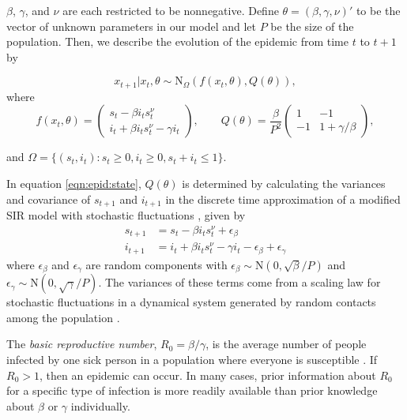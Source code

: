 \noindent $\beta$, $\gamma$, and $\nu$ are each restricted to be nonnegative. Define $\theta = (\beta,\gamma,\nu)'$ to be the vector of unknown parameters in our model and let $P$ be the size of the population. Then, we describe the evolution of the epidemic from time $t$ to $t + 1$ by

\begin{equation}
x_{t+1}\left|x_t,\theta\right. \sim \mbox{N}_\Omega\left(f(x_t,\theta),Q(\theta)\right), \label{eqn:epid:state}
\end{equation}
\noindent where
\[
f(x_t,\theta) = \left(
\begin{array}{c}
s_t - \beta i_ts^\nu_t \phantom{- \gamma i_t}\,\, \\
i_t +  \beta i_ts^\nu_t - \gamma i_t
\end{array}
\right),
\qquad
Q(\theta) = \frac{\beta}{P^2} \left(
\begin{array}{ccccc}
1 & -1 \\
-1 & 1 + \gamma/\beta
\end{array}
\right),
\]

\noindent and $\Omega = \{(s_t,i_t): s_t \ge 0, i_t \ge 0, s_t + i_t \le 1\}$.

In equation \eqref{eqn:epid:state}, $Q(\theta)$ is determined by calculating the variances and covariance of $s_{t+1}$ and $i_{t+1}$ in the discrete time approximation of a modified SIR model with stochastic fluctuations \citep{herwaarden1995stochepid, dangerfield2009stochepid, anderson2004sars}, given by
\begin{align*}
s_{t+1} &= s_t - \beta i_ts^\nu_t + \epsilon_\beta \\
i_{t+1} &= i_t + \beta i_ts^\nu_t - \gamma i_t - \epsilon_\beta + \epsilon_\gamma
\end{align*}
where $\epsilon_\beta$ and $\epsilon_\gamma$ are random components with $\epsilon_\beta \sim \mbox{N}(0, \sqrt{\beta} / P)$ and $\epsilon_\gamma \sim \mbox{N}(0, \sqrt{\gamma} / P)$. The variances of these terms come from a scaling law for stochastic fluctuations in a dynamical system generated by random contacts among the population \citep{ovaskainen2010extinction, herwaarden1995stochepid, dangerfield2009stochepid, skvortsov2012monitoring}.

The \emph{basic reproductive number}, $R_0 = \beta / \gamma$, is the average number of people infected by one sick person in a population where everyone is susceptible \citep{heff2005repratio}. If $R_0 > 1$, then an epidemic can occur. In many cases, prior information about $R_0$ for a specific type of infection is more readily available than prior knowledge about $\beta$ or $\gamma$ individually.

